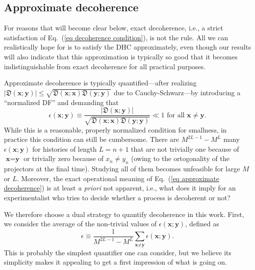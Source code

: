 \documentclass[pre,onecolumn,12pt,aps,longbibliography,nofootinbib]{revtex4-2}
\newcommand{\bb}[1]{\textbf{#1}}
\newcommand{\mf}[1]{{\mathfrak{#1}}}
\newcommand{\new}[1]{#1}
\begin{document}
\subsection{\new{Approximate decoherence}}
\label{sec approximate decoherence}

For reasons that will become clear below, exact decoherence, i.e., a strict satisfaction of Eq.~(\ref{eq decoherence condition}), is not the rule. All we can realistically hope for is to satisfy the DHC approximately, even though our results will also indicate that this approximation is typically so good that it becomes indistinguishable from exact decoherence for all practical purposes.

Approximate decoherence is typically quantified---after realizing $|\mf{D}(\bb x;\bb y)|\le\sqrt{\mf{D}(\bb x;\bb x)\mf{D}(\bb y;\bb y)}$ due to Cauchy-Schwarz---by introducing a ``normalized DF'' and demanding that~\cite{DowkerHalliwellPRD1992}
\begin{equation}\label{eq approximate decoherence}
 \epsilon(\bb x;\bb y) \equiv \frac{|\mf{D}(\bb x;\bb y)|}{\sqrt{\mf{D}(\bb x;\bb x)\mf{D}(\bb y;\bb y)}} \ll 1 \text{ for all } \bb x\neq\bb y.
\end{equation}
While this is a reasonable, properly normalized condition for smallness, in practice this condition can still be cumbersome. There are $M^{2L-1}-M^L$ many $\epsilon(\bb x;\bb y)$ for histories of length $L=n+1$ that are not trivially one because of $\bb x=\bb y$ or trivially zero because of $x_n\neq y_n$ (owing to the ortogonality of the projectors at the final time). Studying all of them becomes unfeasible for large $M$ or $L$. Moreover, the exact operational meaning of Eq.~(\ref{eq approximate decoherence}) is at least \emph{a priori} not apparent, i.e., what does it imply for an experimentalist who tries to decide whether a process is decoherent or not?

We therefore choose a dual strategy to quantify decoherence in this work. First, we consider the average of the non-trivial values of $\epsilon(\bb x;\bb y)$, defined as
\begin{equation}\label{eq epsilon avg}
 \epsilon \equiv \frac{1}{M^{2L-1}-M^L} \sum_{\bb x\neq\bb y} \epsilon(\bb x;\bb y).
\end{equation}
This is probably the simplest quantifier one can consider, but we believe its simplicity makes it appealing to get a first impression of what is going on.
\end{document}
